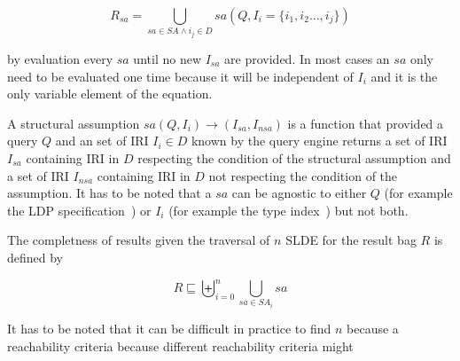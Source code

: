 \begin{equation}
R_{sa} = \bigcup_{sa \in SA \land i_j \in D} sa(Q, I_{i} = \{i_1, i_2 ..., i_j\}) 
\end{equation}

by evaluation every $sa$ until no new $I_{sa}$ are provided. 
In most cases an $sa$ only need to be evaluated one time because it will be independent of $I_i$ and it is the only variable element of the equation.



\begin{definition}\label{def:structuralAssumption}
   A structural assumption $sa(Q, I_{i}) \rightarrow (I_{sa}, I_{nsa})$ is a function that provided a query $Q$ and an set of IRI $I_{i} \in D$ known by the query engine 
   returns a set of IRI $I_{sa}$ containing IRI in $D$ respecting the condition of the structural assumption and a set of IRI $I_{nsa}$ containing IRI in $D$ not respecting
   the condition of the assumption.
   It has to be noted that a $sa$ can be agnostic to either $Q$ (for example the LDP specification~\cite{Taelman2023}) or $I_i$ (for example the type index~\cite{Taelman2023}) but not both.  
\end{definition}



The completness of results given the traversal of $n$ SLDE for the result bag $R$ is defined by 

\begin{equation}
   R   \sqsubseteq  \biguplus_{i=0}^{n} \bigcup_{sa \in SA_i} sa 
\end{equation}

It has to be noted that it can be difficult in practice to find $n$ because a reachability criteria because different reachability criteria might 


\iffalse
While BQPs are syntactic objects, we shall use them as a represen-
tation of Linked Data queries which have a certain semantics. In the
remainder of this section we define this semantics. Due to the open-
ness and distributed nature of Webs such as the WWW we cannot
guarantee query results that are complete w.r.t. all Linked Data on
a Web. Nonetheless, we aim to provide a well-defined semantics.
Consequently, we have to limit our understanding of completeness.
However, instead of restricting ourselves to data from a fixed set
of sources selected or discovered beforehand, we introduce an ap-
proach that allows a query to make use of previously unknown data
and sources. Our definition of query semantics is based on a two-
phase approach: First, we define the part of a Web of Linked Data
that is reached by traversing links using the identifiers in a query
as a starting point. Then, we formalize the result of such a query
as the set of all valuations that map the query to a subset of all
data in the reachable part of the Web. Notice, while this two-phase
approach provides for a straightforward definition of the query se-
mantics in our model, it does not correspond to the actual query
execution strategy of integrating the traversal of data links into the
query execution process as illustrated in Section 2.
\fi



